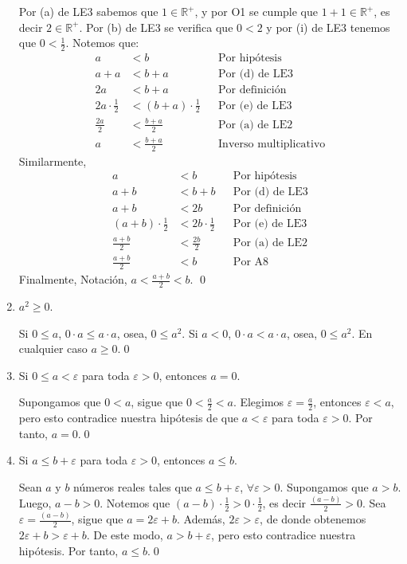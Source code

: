 \documentclass[11pt]{article}
\newcommand{\R}{\mathbb{R}}
\begin{document}
\begin{enumerate}[label=\alph*)]
    Por (a) de LE3 sabemos que $1 \in \R^+$, y por O1 se cumple que $1+1 \in \R^+$, es decir $2 \in \R^+$. Por (b) de LE3 se verifica que $0<2$ y por (i) de LE3 tenemos que $0<\frac{1}{2}$. Notemos que: \begin{align*}
        a &< b && \text{Por hipótesis} \\
        a + a &< b+a && \text{Por (d) de LE3} \\
        2a &< b+a && \text{Por definición} \\
        2a \cdot \frac{1}{2} &< (b+a) \cdot \frac{1}{2} && \text{Por (e) de LE3} \\
        \frac{2a}{2} &< \frac{b+a}{2} && \text{Por (a) de LE2} \\
        a &< \frac{b+a}{2} && \text{Inverso multiplicativo}
    \end{align*} Similarmente,
    \begin{align*}
        a &< b && \text{Por hipótesis} \\
        a + b &< b+b && \text{Por (d) de LE3} \\
        a +b &< 2b && \text{Por definición} \\
        (a+b) \cdot \frac{1}{2} &< 2b \cdot \frac{1}{2} && \text{Por (e) de LE3} \\
        \frac{a+b}{2} &< \frac{2b}{2} && \text{Por (a) de LE2} \\
        \frac{a+b}{2} &< b && \text{Por A8}
    \end{align*} Finalmente, Notación, $a < \frac{a+b}{2} < b$. \qed

    \item $a^2\geq 0$.
    
    Si $0 \leq a$, $ 0\cdot a \leq a \cdot a$, osea, $0 \leq a^2$. Si $a<0$, $0\cdot a < a \cdot a$, osea, $0 \leq a^2$. En cualquier caso $a\geq0$.\qed

    \item Si $0 \leq a < \varepsilon$ para toda $\varepsilon > 0$, entonces $a=0$.
    
    Supongamos que $0<a$, sigue que $0<\frac{a}{2}<a$. Elegimos $\varepsilon=\frac{a}{2}$, entonces $\varepsilon<a$, pero esto contradice nuestra hipótesis de que $a< \varepsilon$ para toda $\varepsilon>0$. Por tanto, $a=0$.\qed

    \item Si $a \leq b + \varepsilon$ para toda $\varepsilon > 0$, entonces $a \leq b$.
    
    Sean $a$ y $b$ números reales tales que $a \leq b + \varepsilon$, $\forall \varepsilon > 0$. Supongamos que $a > b$. Luego, $a-b>0$. Notemos que $(a-b) \cdot \frac{1}{2} > 0 \cdot \frac{1}{2}$, es decir $\frac{(a-b)}{2} > 0$. Sea $\varepsilon = \frac{(a-b)}{2}$, sigue que $a=2\varepsilon+b$. Además, $2\varepsilon > \varepsilon$, de donde obtenemos $2 \varepsilon + b > \varepsilon + b$. De este modo, $a > b+\varepsilon$, pero esto contradice nuestra hipótesis. Por tanto, $a \leq b$.\qed

\end{enumerate}
\end{document}
